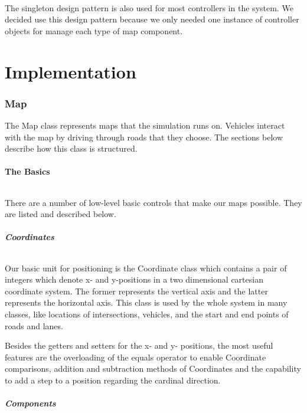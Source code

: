 \documentclass[a4paper,11pt,titlepage]{article}
\begin{document}
\paragraph{}
The singleton design pattern is also used for most controllers in the system. We decided use this design pattern because we only needed one instance of controller objects for manage each type of map component.

\part{Implementation}
\section{Map}
The Map class represents maps that the simulation runs on. Vehicles interact with the map by driving through roads that they choose. The sections below describe how this class is structured.
\subsection{The Basics}
\paragraph{}
There are a number of low-level basic controls that make our maps possible. They are listed and described below.
\subsubsection{Coordinates}
\paragraph{}
Our basic unit for positioning is the Coordinate class which contains a pair of integers which denote  x- and y-positions in a two dimensional cartesian coordinate system. The former represents the vertical axis and the latter represents the horizontal axis. This class is used by the whole system in many classes, like locations of intersections, vehicles, and the start and end points of roads and lanes.

Besides the getters and setters for the x- and y- positions, the most useful features are the overloading of the equals operator to enable Coordinate comparisons, addition and subtraction methods of Coordinates and the capability to add a step to a position regarding the cardinal direction.
\subsubsection{Components}
\end{document}
